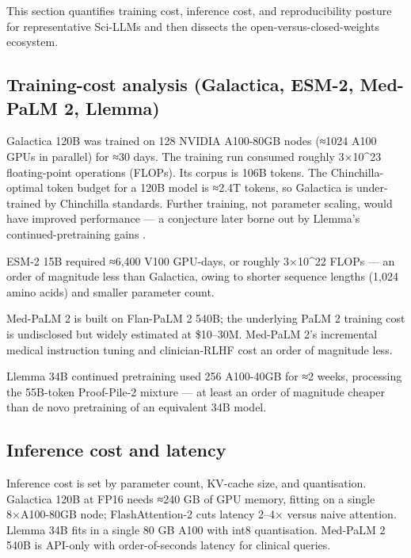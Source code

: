 \documentclass{article}
\begin{document}
This section quantifies training cost, inference cost, and reproducibility posture for representative Sci-LLMs and then dissects the open-versus-closed-weights ecosystem.

\subsection{Training-cost analysis (Galactica, ESM-2, Med-PaLM 2, Llemma)}\label{training-cost-analysis-galactica-esm-2-med-palm-2-llemma}

Galactica 120B \cite{taylor2022arxiv2211090852022} was trained on 128 NVIDIA A100-80GB nodes (≈1024 A100 GPUs in parallel) for ≈30 days. The training run consumed roughly 3×10\^{}23 floating-point operations (FLOPs). Its corpus is 106B tokens. The Chinchilla-optimal token budget for a 120B model is ≈2.4T tokens, so Galactica is under-trained by Chinchilla standards. Further training, not parameter scaling, would have improved performance --- a conjecture later borne out by Llemma's continued-pretraining gains \cite{azerbayev2023llemmaanopenlangua}.

ESM-2 15B \cite{lin2022evolutionaryscalep} required ≈6,400 V100 GPU-days, or roughly 3×10\^{}22 FLOPs --- an order of magnitude less than Galactica, owing to shorter sequence lengths (1,024 amino acids) and smaller parameter count.

Med-PaLM 2 \cite{singhal2025towardexpertlevelm} is built on Flan-PaLM 2 540B; the underlying PaLM 2 training cost is undisclosed but widely estimated at \$10--30M. Med-PaLM 2's incremental medical instruction tuning and clinician-RLHF cost an order of magnitude less.

Llemma 34B \cite{azerbayev2023llemmaanopenlangua} continued pretraining used 256 A100-40GB for ≈2 weeks, processing the 55B-token Proof-Pile-2 mixture --- at least an order of magnitude cheaper than de novo pretraining of an equivalent 34B model.

\subsection{Inference cost and latency}\label{inference-cost-and-latency}

Inference cost is set by parameter count, KV-cache size, and quantisation. Galactica 120B at FP16 needs ≈240 GB of GPU memory, fitting on a single 8×A100-80GB node; FlashAttention-2 cuts latency 2--4× versus naive attention. Llemma 34B fits in a single 80 GB A100 with int8 quantisation. Med-PaLM 2 540B is API-only with order-of-seconds latency for clinical queries.
\end{document}
